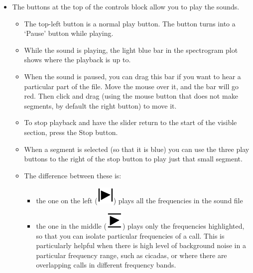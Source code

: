 \documentclass{article}
\begin{document}
\begin{itemize}
\item The buttons at the top of the controls block allow you to play the sounds. 

\begin{itemize}
\item The top-left button is a normal play button. The button turns into a `Pause' button while playing.  
\item While the sound is playing, the light blue bar in the spectrogram plot shows where the playback is up to. 
\item When the sound is paused, you can drag this bar if you want to hear a particular part of the file. Move the mouse over it, and the bar will go red. Then click and drag (using the mouse button that does not make segments, by default the right button) to move it. 
\item To stop playback and have the slider return to the start of the visible section, press the Stop button.
\item When a segment is selected (so that it is blue) you can use the three play buttons to the right of the stop button to play just that small segment. 
\item The difference between these is:
    \begin{itemize} 
    \item the one on the left (\includegraphics[scale=0.3]{Figures/playsegment}) plays all the frequencies in the sound file 
    \item the one in the middle (\includegraphics[scale=0.3]{Figures/playBandLimited}) plays only the frequencies highlighted, so that you can isolate particular frequencies of a call. This is particularly helpful when there is high level of background noise in a particular frequency range, such as cicadas, or where there are overlapping calls in different frequency bands.

\end{itemize}
\end{itemize}
\end{itemize}
\end{document}
